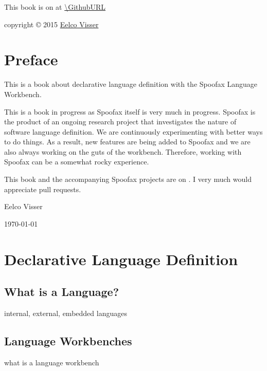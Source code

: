 	\maketitle
	
\vspace*{\fill}

This book is on  at \url{\GithubURL}

\vspace*{\fill}

copyright \copyright{} 2015 \href{http://eelcovisser.org}{Eelco Visser}
	
\newpage
\tableofcontents

\newpage
\chapter*{Preface}

This is a book about declarative language definition with the Spoofax Language
Workbench.

This is a book in progress as Spoofax itself is very much in progress.
Spoofax is the product of an ongoing research project that investigates the
nature of software language definition.
We are continuously experimenting with better ways to do things. 
As a result, new features are being added to Spoofax and we are also always
working on the guts of the workbench.
Therefore, working with Spoofax can be a somewhat rocky experience.

This book and the accompanying Spoofax projects are on . 
I very much would appreciate pull requests.

Eelco Visser

\today

\newpage
\chapter{Declarative Language Definition}


\section{What is a Language?}

internal, external, embedded languages

\newpage
\section{Language Workbenches}

what is a language workbench


